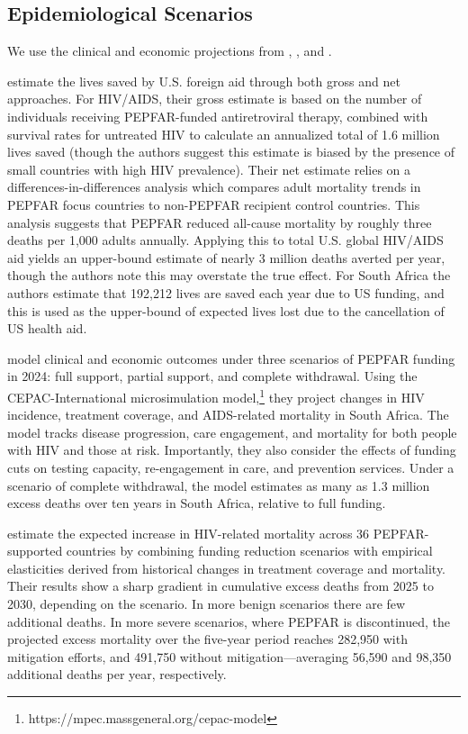 \documentclass[letterpaper,12pt]{article}
\theoremstyle{definition}
\begin{document}
\begin{spacing}{1.5}
\subsection{Epidemiological Scenarios}
We use the clinical and economic projections from \citet{KS2025}, \citet{Gandhi2025}, and \citet{Brink2025}.

\citet{KS2025} estimate the lives saved by U.S. foreign aid through both gross and net approaches. For HIV/AIDS, their gross estimate is based on the number of individuals receiving PEPFAR-funded antiretroviral therapy, combined with survival rates for untreated HIV to calculate an annualized total of 1.6 million lives saved (though the authors suggest this estimate is biased by the presence of small countries with high HIV prevalence). Their net estimate relies on a differences-in-differences analysis which compares adult mortality trends in PEPFAR focus countries to non-PEPFAR recipient control countries. This analysis suggests that PEPFAR reduced all-cause mortality by roughly three deaths per 1,000 adults annually. Applying this to total U.S. global HIV/AIDS aid yields an upper-bound estimate of nearly 3 million deaths averted per year, though the authors note this may overstate the true effect. For South Africa the authors estimate that 192,212 lives are saved each year due to US funding, and this is used as the upper-bound of expected lives lost due to the cancellation of US health aid.

\citet{Gandhi2025} model clinical and economic outcomes under three scenarios of PEPFAR funding in 2024: full support, partial support, and complete withdrawal. Using the CEPAC-International microsimulation model,\footnote{https://mpec.massgeneral.org/cepac-model} they project changes in HIV incidence, treatment coverage, and AIDS-related mortality in South Africa. The model tracks disease progression, care engagement, and mortality for both people with HIV and those at risk. Importantly, they also consider the effects of funding cuts on testing capacity, re-engagement in care, and prevention services. Under a scenario of complete withdrawal, the model estimates as many as 1.3 million excess deaths over ten years in South Africa, relative to full funding.

 estimate the expected increase in HIV-related mortality across 36 PEPFAR-supported countries by combining funding reduction scenarios with empirical elasticities derived from historical changes in treatment coverage and mortality. Their results show a sharp gradient in cumulative excess deaths from 2025 to 2030, depending on the scenario. In more benign scenarios there are few additional deaths. In more severe scenarios, where PEPFAR is discontinued, the projected excess mortality over the five-year period reaches 282,950 with mitigation efforts, and 491,750 without mitigation—averaging 56,590 and 98,350 additional deaths per year, respectively.


\end{spacing}
\end{document}
